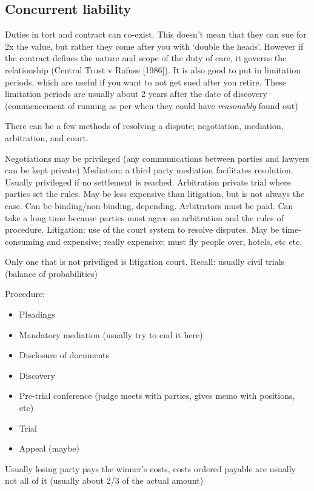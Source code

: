 \documentclass[10pt]{article}
\begin{document}
\subsection{Concurrent liability}
Duties in tort and contract can co-exist. This doesn't mean that they can sue for 2x the value, but rather they come after you with `double the heads'. 
However if the contract defines the nature and scope of the duty of care, it governs the relationship (Central Trust v Rafuse [1986]).
It is also good to put in limitation periods, which are useful if you want to not get sued after you retire. 
These limitation periods are usually about 2 years after the date of discovery (commencement of running as per when they could have \textit{reasonably} found out)

There can be a few methods of resolving a dispute; negotiation, mediation, arbitration, and court.

Negotiations may be privileged (any communications between parties and lawyers can be kept private)
Mediation: a third party mediation facilitates resolution.  Usually privileged if no settlement is reached.
Arbitration private trial where parties set the rules. May be less expensive than litigation, but is not always the case. Can be binding/non-binding, depending. Arbitrators must be paid.
Can take a long time because parties must agree on arbitration	and the rules of procedure.
Litigation: use of the court system to resolve disputes. May be time-consuming and expensive; really expensive; must fly people over, hotels, etc etc.

Only one that is not priviliged is litigation court.
Recall: usually civil trials (balance of probabilities)

Procedure:
\begin{itemize}
	\item Pleadings
	\item Mandatory mediation (usually try to end it here)
	\item Disclosure of documents
	\item Discovery
	\item Pre-trial conference (judge meets with parties, gives memo with positions, etc)
	\item Trial
	\item Appeal (maybe)
\end{itemize}

Usually losing party pays the winner's costs, costs ordered payable are usually not all of it (usually about 2/3 of the actual amount)
\end{document}
